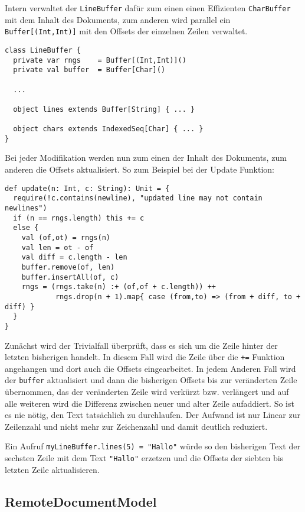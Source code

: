 Intern verwaltet der \texttt{LineBuffer} dafür zum einen einen Effizienten \texttt{CharBuffer} mit
dem Inhalt des Dokuments, zum anderen wird parallel ein \texttt{Buffer[(Int,Int)]} mit den Offsets
der einzelnen Zeilen verwaltet.

\begin{lstlisting}
class LineBuffer {
  private var rngs    = Buffer[(Int,Int)]()  
  private val buffer  = Buffer[Char]()     

  ...
    
  object lines extends Buffer[String] { ... } 
  
  object chars extends IndexedSeq[Char] { ... } 
}
\end{lstlisting}

Bei jeder Modifikation werden nun zum einen der Inhalt des Dokuments, zum anderen die Offsets
aktualisiert. So zum Beispiel bei der Update Funktion:

\begin{lstlisting}
def update(n: Int, c: String): Unit = {
  require(!c.contains(newline), "updated line may not contain newlines")
  if (n == rngs.length) this += c
  else {      
    val (of,ot) = rngs(n)
    val len = ot - of
    val diff = c.length - len
    buffer.remove(of, len)
    buffer.insertAll(of, c)
    rngs = (rngs.take(n) :+ (of,of + c.length)) ++ 
            rngs.drop(n + 1).map{ case (from,to) => (from + diff, to + diff) }
  }
}    
\end{lstlisting}

Zunächst wird der Trivialfall überprüft, dass es sich um die Zeile hinter der letzten bisherigen
handelt. In diesem Fall wird die Zeile über die \texttt{+=} Funktion angehangen und dort auch die
Offsets eingearbeitet. In jedem Anderen Fall wird der \texttt{buffer} aktualisiert und dann die
bisherigen Offsets bis zur veränderten Zeile übernommen, das der veränderten Zeile wird verkürzt
bzw. verlängert und auf alle weiteren wird die Differenz zwischen neuer und alter Zeile aufaddiert.
So ist es nie nötig, den Text tatsächlich zu durchlaufen. Der Aufwand ist nur Linear zur Zeilenzahl
und nicht mehr zur Zeichenzahl und damit deutlich reduziert.

Ein Aufruf \texttt{myLineBuffer.lines(5) = "Hallo"} würde so den bisherigen Text der sechsten Zeile
mit dem Text \texttt{"Hallo"} erzetzen und die Offsets der siebten bis letzten Zeile aktualisieren.

\subsection{RemoteDocumentModel}

